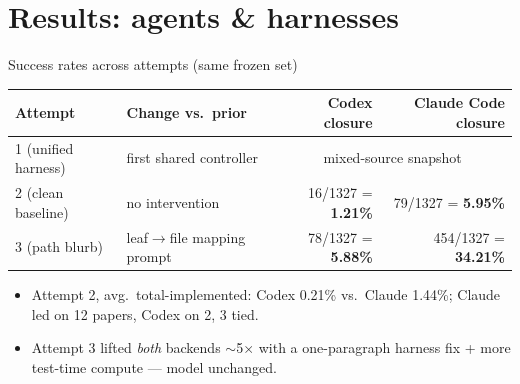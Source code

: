 \documentclass[aspectratio=169]{beamer}
\begin{document}
\section{Results: agents \& harnesses}

\begin{frame}{Success rates across attempts (same frozen set)}
  \begin{table}
    \small
    \begin{tabular}{llrr}
      \toprule
      Attempt & Change vs.\ prior & Codex closure & Claude Code closure \\
      \midrule
      1 (unified harness) & first shared controller & \multicolumn{2}{c}{mixed-source snapshot} \\
      2 (clean baseline) & no intervention & 16/1327 = \textbf{1.21\%} & 79/1327 = \textbf{5.95\%} \\
      3 (path blurb) & leaf$\rightarrow$file mapping prompt & 78/1327 = \textbf{5.88\%} & 454/1327 = \textbf{34.21\%} \\
      \bottomrule
    \end{tabular}
  \end{table}
  \vspace{0.6em}
  \begin{itemize}
    \item Attempt 2, avg.\ total-implemented: Codex 0.21\% vs.\ Claude 1.44\%;
          Claude led on 12 papers, Codex on 2, 3 tied.
    \item Attempt 3 lifted \emph{both} backends $\sim$5$\times$ with a one-paragraph
          harness fix + more test-time compute --- model unchanged.
  \end{itemize}
\end{frame}
\end{document}
